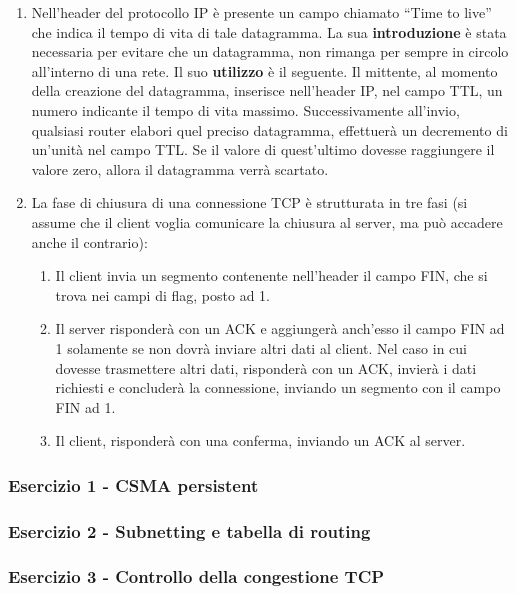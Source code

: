 \documentclass[a4paper]{article}
\newcommand{\dquotes}[1]{``#1''}
\begin{document}
\begin{enumerate}
		\item Nell'header del protocollo IP è presente un campo chiamato \dquotes{Time to live} che indica il tempo di vita di tale datagramma. La sua \textbf{introduzione} è stata necessaria per evitare che un datagramma, non rimanga per sempre in circolo all'interno di una rete.\newline
		Il suo \textbf{utilizzo} è il seguente. Il mittente, al momento della creazione del datagramma, inserisce nell'header IP, nel campo TTL, un numero indicante il tempo di vita massimo. Successivamente all'invio, qualsiasi router elabori quel preciso datagramma, effettuerà un decremento di un'unità nel campo TTL. Se il valore di quest'ultimo dovesse raggiungere il valore zero, allora il datagramma verrà scartato.
		
		\item La fase di chiusura di una connessione TCP è strutturata in tre fasi (si assume che il client voglia comunicare la chiusura al server, ma può accadere anche il contrario):
		\begin{enumerate}
			\item Il client invia un segmento contenente nell'header il campo FIN, che si trova nei campi di flag, posto ad 1.
			
			\item Il server risponderà con un ACK e aggiungerà anch'esso il campo FIN ad 1 solamente se non dovrà inviare altri dati al client.\newline
			Nel caso in cui dovesse trasmettere altri dati, risponderà con un ACK, invierà i dati richiesti e concluderà la connessione, inviando un segmento con il campo FIN ad 1.
			
			\item Il client, risponderà con una conferma, inviando un ACK al server.
		\end{enumerate}
	\end{enumerate}
	
	\subsubsection{Esercizio 1 - CSMA persistent}
	
	\subsubsection{Esercizio 2 - Subnetting e tabella di routing}
	
	\subsubsection{Esercizio 3 - Controllo della congestione TCP}
	
\end{document}
